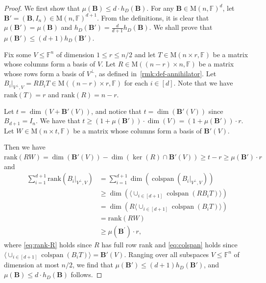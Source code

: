 \documentclass[11pt]{article}
\theoremstyle{plain}
\numberwithin{equation}{section}
\theoremstyle{definition}
\newcommand{\F}{\mathbb{F}}
\newcommand{\rk}{\mathrm{rank}}
\newcommand{\M}{\mathrm{M}}
\newcommand{\tuple}[1]{\mathbf{#1}}
\newcommand{\vB}{\tuple{B}}
\newcommand{\colspan}{\operatorname{colspan}}
\newcommand{\ann}{V^{\perp}}
\begin{document}
\begin{proof}
  We first show that $\mu(\vB)\leq d\cdot h_D(\vB)$. For any $\vB\in \M(n,\F)^d$, let $\vB'=(\vB,I_n)\in \M(n,\F)^{d+1}$. From the definitions, it is clear that $\mu(\vB')=\mu(\vB)$ and $h_D(\vB')=\frac{d}{d+1} h_D(\vB)$. We shall prove that $\mu(\vB')\leq (d+1)h_D(\vB')$.
  
  Fix some $V\leq \F^n$ of dimension $1 \leq r\leq n/2$ and let $T\in \M(n\times r,\F)$ be a matrix whose columns form a basis of $V$. Let $R\in \M((n-r)\times n,\F)$ be a matrix whose rows form a basis of $\ann$, as defined in~\cref{rmk:def-annihilator}. Let $B_i|_{\ann,V}=RB_iT\in\M((n-r)\times r,\F)$ for each $i\in[d]$. Note that we have $\rk(T)=r$ and $\rk(R)=n-r$.
  
  Let $t=\dim(V+\vB'(V))$, and notice that $t=\dim(\vB'(V))$ since $B_{d+1}=I_n$. We have that $t\geq (1+\mu(\vB'))\cdot\dim(V)=(1+\mu(\vB'))\cdot r$. Let $W\in \M(n\times t,\F)$ be a matrix whose columns form a basis of $\vB'(V)$. 
    
  Then we have $\rk(RW)=\dim(\vB'(V))-\dim(\ker(R)\cap \vB'(V))\geq t-r \geq \mu(\vB')\cdot r$ and
  \begin{align}
    \sum_{i=1}^{d+1}\rk(B_i|_{\ann, V}) & =  \sum_{i=1}^{d+1}\dim(\colspan(B_i|_{\ann, V})) \nonumber \\
    & \geq \dim(\langle\cup_{i\in[d+1]} \colspan(RB_i T)\rangle) \nonumber \\ 
    & = \dim(R\langle\cup_{i\in[d+1]} \colspan(B_iT)\rangle)\label{eq:rank-R} \\
    & = \rk(RW) \label{eq:colspan} \\
    & \geq \mu(\vB^{\prime})\cdot r,\nonumber
  \end{align}
  where \eqref{eq:rank-R} holds since $R$ has full row rank and \eqref{eq:colspan} holds  since $\langle \cup_{i\in[d+1]} \colspan(B_iT)\rangle=\vB'(V)$.
  Ranging over all subspaces $V\leq\F^n$ of dimension at most $n/2$, %
  we find that $\mu(\vB')\leq (d+1) h_D(\vB')$, and $\mu(\vB)\leq d\cdot h_D(\vB)$ follows.
  

\end{proof}
\end{document}
